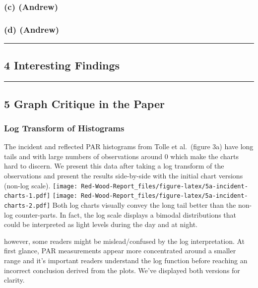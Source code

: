 \documentclass[
  twocolumn]{article}
\begin{document}
\hypertarget{c-andrew}{%
\subsubsection{(c) (Andrew)}\label{c-andrew}}

\hypertarget{d-andrew}{%
\subsubsection{(d) (Andrew)}\label{d-andrew}}

\begin{center}\rule{0.5\linewidth}{0.5pt}\end{center}

\hypertarget{interesting-findings}{%
\subsection{4 Interesting Findings}\label{interesting-findings}}

\begin{center}\rule{0.5\linewidth}{0.5pt}\end{center}

\hypertarget{graph-critique-in-the-paper}{%
\subsection{5 Graph Critique in the
Paper}\label{graph-critique-in-the-paper}}

\hypertarget{log-transform-of-histograms}{%
\subsubsection{Log Transform of
Histograms}\label{log-transform-of-histograms}}

The incident and reflected PAR histograms from Tolle et al.~(figure 3a)
have long tails and with large numbers of observations around 0 which
make the charts hard to discern. We present this data after taking a log
transform of the observations and present the results side-by-side with
the initial chart versions (non-log scale).
\texttt{[image: Red-Wood-Report\_files/figure-latex/5a-incident-charts-1.pdf]}
\texttt{[image: Red-Wood-Report\_files/figure-latex/5a-incident-charts-2.pdf]}
Both log charts visually convey the long tail better than the non-log
counter-parts. In fact, the log scale displays a bimodal distributions
that could be interpreted as light levels during the day and at night.

however, some readers might be mislead/confused by the log
interpretation. At first glance, PAR measurements appear more
concentrated around a smaller range and it's important readers
understand the log function before reaching an incorrect conclusion
derived from the plots. We've displayed both versions for clarity.
\end{document}
